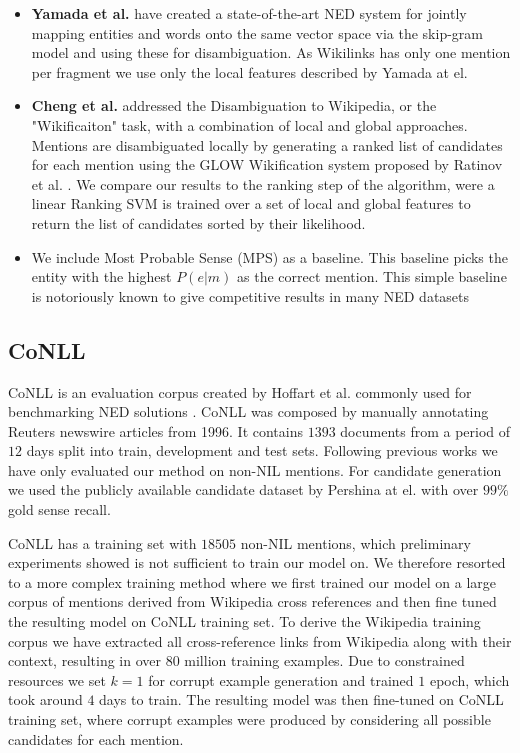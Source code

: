\documentclass[11pt]{article}
\begin{document}
	\begin{itemize} 
		\item  \textbf{Yamada et al.} \cite{Yamada2016} have created a state-of-the-art NED system for jointly mapping entities and words onto the same vector space via the skip-gram model and using these for disambiguation. As Wikilinks has only one mention per fragment we use only the local features described by Yamada at el.
		
		\item \textbf{Cheng et al.} \cite{Cheng2013} addressed the Disambiguation to Wikipedia, or the "Wikificaiton" task, with a combination of local and global approaches. Mentions are disambiguated locally by generating a ranked list of candidates for each mention using the GLOW Wikification system proposed by Ratinov et al. \cite{Ratinov2011}. We compare our results to the ranking step of the algorithm, were a linear Ranking SVM is trained over a set of local and global features to return the list of candidates sorted by their likelihood.
		
		\item We include Most Probable Sense (MPS) as a baseline. This baseline picks the entity with the highest $P(e|m)$ as the correct mention. This simple baseline is notoriously known to give competitive results in many NED datasets 
	\end{itemize}

    \subsection{CoNLL}
    CoNLL is an evaluation corpus created by Hoffart et al. \cite{hoffart2011robust} commonly used for benchmarking NED solutions \cite{Globerson2016,Hachey2013,Yamada2016,Pershina2015}. CoNLL was composed by manually annotating Reuters newswire articles from 1996. It contains $1393$ documents from a period of $12$ days split into train, development and test sets. Following previous works we have only evaluated our method on non-NIL mentions. For candidate generation we used the publicly available candidate dataset by Pershina at el. \cite{Pershina2015} with over $99\%$ gold sense recall.
	
	CoNLL has a training set with $18505$ non-NIL mentions, which preliminary experiments showed is not sufficient to train our model on. We therefore resorted to a more complex training method where we first trained our model on a large corpus of mentions derived from Wikipedia cross references and then fine tuned the resulting model on CoNLL training set. To derive the Wikipedia training corpus we have extracted all cross-reference links from Wikipedia along with their context, resulting in over $80$ million training examples. Due to constrained resources we set $k=1$ for corrupt example generation and trained $1$ epoch, which took around $4$ days to train. The resulting model was then fine-tuned on CoNLL training set, where corrupt examples were produced by considering all possible candidates for each mention.
\end{document}
